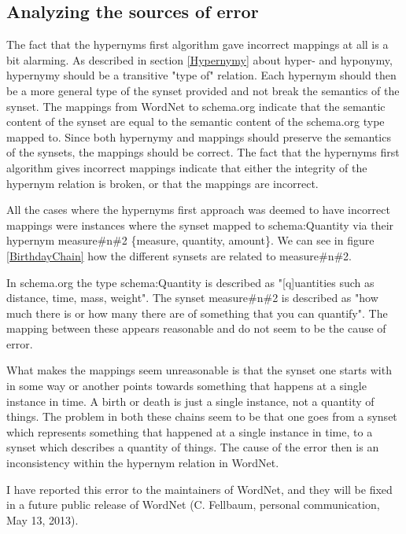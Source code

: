 \subsection{Analyzing the sources of error}
The fact that the hypernyms first algorithm gave incorrect mappings at all is a bit alarming.
As described in section \ref{Hypernymy} about hyper- and hyponymy, hypernymy should be a transitive "type of" relation.
Each hypernym should then be a more general type of the synset provided and not break the semantics of the synset.
The mappings from WordNet to schema.org indicate that the semantic content of the synset are equal to the
semantic content of the schema.org type mapped to.
Since both hypernymy and mappings should preserve the semantics of the synsets, the mappings should be correct.
The fact that the hypernyms first algorithm gives incorrect mappings indicate that either the integrity of the hypernym relation is broken,
or that the mappings are incorrect.

All the cases where the hypernyms first approach was deemed to have incorrect mappings were instances where the synset
mapped to schema:Quantity via their hypernym measure\#n\#2 \{measure, quantity, amount\}.
We can see in figure \ref{BirthdayChain} how the different synsets are related to measure\#n\#2.


In schema.org the type schema:Quantity is described as "[q]uantities such as distance, time, mass, weight".
The synset measure\#n\#2 is described as "how much there is or how many there are of something that you can quantify".
The mapping between these appears reasonable and do not seem to be the cause of error.

What makes the mappings seem unreasonable is that the synset one starts with in some way or another points towards
something that happens at a single instance in time.
A birth or death is just a single instance, not a quantity of things.
The problem in both these chains seem to be that one goes from a synset which represents something that happened at a
single instance in time, to a synset which describes a quantity of things.
The cause of the error then is an inconsistency within the hypernym relation in WordNet.

I have reported this error to the maintainers of WordNet, and they will be fixed in a future public release of WordNet
(C. Fellbaum, personal communication, May 13, 2013).


